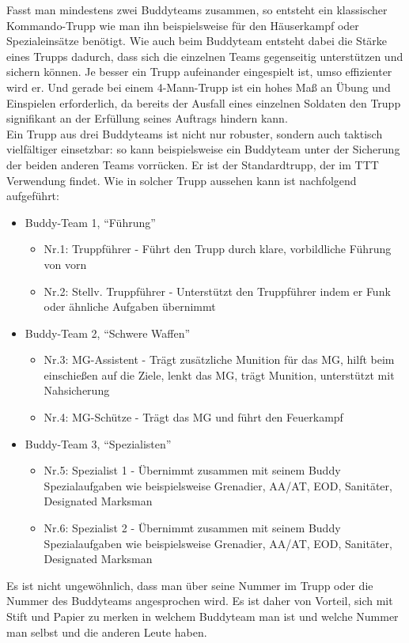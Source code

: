 Fasst man mindestens zwei Buddyteams zusammen, so entsteht ein klassischer Kommando-Trupp wie man ihn beispielsweise für den Häuserkampf oder Spezialeinsätze benötigt. Wie auch beim Buddyteam entsteht dabei die Stärke eines Trupps dadurch, dass sich die einzelnen Teams gegenseitig unterstützen und sichern können. Je besser ein Trupp aufeinander eingespielt ist, umso effizienter wird er. Und gerade bei einem 4-Mann-Trupp ist ein hohes Maß an Übung und Einspielen erforderlich, da bereits der Ausfall eines einzelnen Soldaten den Trupp signifikant an der Erfüllung seines Auftrags hindern kann. \\
	Ein Trupp aus drei Buddyteams ist nicht nur robuster, sondern auch taktisch vielfältiger einsetzbar: so kann beispielsweise ein Buddyteam unter der Sicherung der beiden anderen Teams vorrücken. Er ist der Standardtrupp, der im \ac{TTT} Verwendung findet. Wie in solcher Trupp aussehen kann ist nachfolgend aufgeführt:
		\begin{itemize}
			\item Buddy-Team 1, “Führung” 
			\begin{itemize}	
				\item Nr.1: Truppführer -  Führt den Trupp durch klare, vorbildliche Führung von vorn
				\item Nr.2: Stellv. Truppführer - Unterstützt den Truppführer indem er Funk oder ähnliche Aufgaben übernimmt
			\end{itemize}
		\end{itemize}

		\begin{itemize}
			\item Buddy-Team 2, “Schwere Waffen” 
			\begin{itemize}
				\item Nr.3: MG-Assistent - Trägt zusätzliche Munition für das MG, hilft beim einschießen auf die Ziele, lenkt das MG, trägt Munition, unterstützt mit Nahsicherung
				\item Nr.4: MG-Schütze - Trägt das MG und führt den Feuerkampf
			\end{itemize}
		\end{itemize}

		\begin{itemize}
			\item Buddy-Team 3, “Spezialisten” 
			\begin{itemize} 
				\item Nr.5: Spezialist 1 - Übernimmt zusammen mit seinem Buddy Spezialaufgaben wie beispielsweise Grenadier, \ac{AA}/\ac{AT}, \ac{EOD}, Sanitäter, Designated Marksman
				\item Nr.6: Spezialist 2 - Übernimmt zusammen mit seinem Buddy Spezialaufgaben wie beispielsweise Grenadier, \ac{AA}/\ac{AT}, \ac{EOD}, Sanitäter, Designated Marksman
			\end{itemize}
		\end{itemize}
Es ist nicht ungewöhnlich, dass man über seine Nummer im Trupp oder die Nummer des Buddyteams angesprochen wird. Es ist daher von Vorteil, sich mit Stift und Papier zu merken in welchem Buddyteam man ist und welche Nummer man selbst und die anderen Leute haben.




